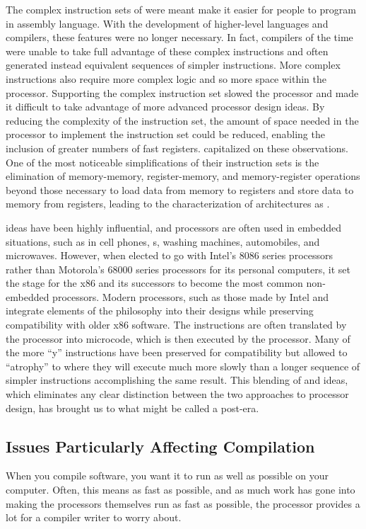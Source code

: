 The complex instruction sets of \CISCs were meant make it easier for people to program in assembly language. With the development of higher-level languages and compilers, these features were no longer necessary. In fact, compilers of the time were unable to take full advantage of these complex instructions and often generated instead equivalent sequences of simpler instructions. More complex instructions also require more complex logic and so more space within the processor. Supporting the complex instruction set slowed the processor and made it difficult to take advantage of more advanced processor design ideas. By reducing the complexity of the instruction set, the amount of space needed in the processor to implement the instruction set could be reduced, enabling the inclusion of greater numbers of fast registers. \RISCs capitalized on these observations. One of the most noticeable simplifications of their instruction sets is the elimination of memory-memory, register-memory, and memory-register operations beyond those necessary to load data from memory to registers and store data to memory from registers, leading to the characterization of \RISC architectures as .

\RISC ideas have been highly influential, and \RISC processors are often used in embedded situations, such as in cell phones, s, washing machines, automobiles, and microwaves. However, when  elected to go with Intel's 8086 series \CISC processors rather than Motorola's 68000 series \RISC processors for its personal computers, it set the stage for the x86 and its successors to become the most common non-embedded processors. Modern \CISC processors, such as those made by Intel and  integrate elements of the \RISC philosophy into their designs while preserving compatibility with older x86 software. The \CISC instructions are often translated by the processor into \RISC microcode, which is then executed by the processor. Many of the more ``\CISC{}y'' instructions have been preserved for compatibility but allowed to ``atrophy'' to where they will execute much more slowly than a longer sequence of simpler instructions accomplishing the same result. This blending of \RISC and \CISC ideas, which eliminates any clear distinction between the two approaches to processor design, has brought us to what might be called a post-\RISC era.

\subsection{Issues Particularly Affecting Compilation}
When you compile software, you want it to run as well as possible on your computer. Often, this means as fast as possible, and as much work has gone into making the processors themselves run as fast as possible, the processor provides a lot for a compiler writer to worry about.


